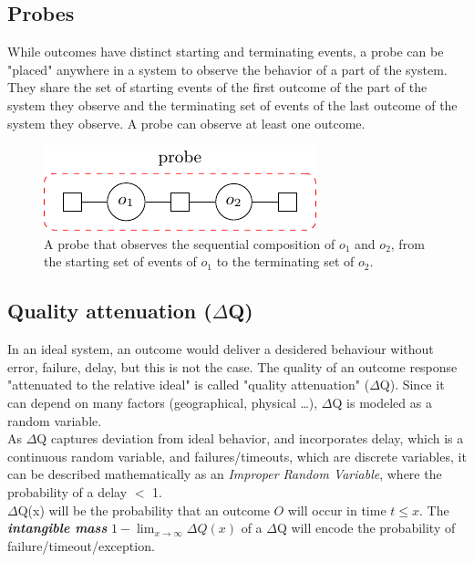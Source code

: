 \subsection{Probes}
    While outcomes have distinct starting and terminating events, a probe can be "placed" anywhere in a system to observe the behavior of a part of the system. They share the set of starting events of the first outcome of the part of the system they observe and the terminating set of events of the last outcome of the system they observe. A probe can observe at least one outcome. 
    
    \begin{figure}[H]
        \begin{center}
            \includegraphics[scale=1.5]{tikz/probe.pdf}
        \end{center}
        \caption{A probe that observes the sequential composition of $o_1$ and $o_2$, from the starting set of events of $o_1$ to the terminating set of $o_2$.}
    \end{figure}

\subsection{Quality attenuation ($\Delta$Q)}
        In an ideal system, an outcome would deliver a desidered behaviour without error, failure, delay, but this is not the case. The quality of an outcome response "attenuated to the relative ideal" is called "quality attenuation" ($\Delta$Q). Since it can depend on many factors (geographical, physical \dots), $\Delta$Q is modeled as a random variable. \\
    As $\Delta$Q captures deviation from ideal behavior, and incorporates delay, which is a continuous random variable, and failures/timeouts, which are discrete variables, it can be described mathematically as an \textit{Improper Random Variable}, where the probability of a delay $<$ 1. \\
    $\Delta$Q(x) will be the probability that an outcome $O$ will occur in time $t \le x$. The \textbf{\textit{intangible mass}} $1 - \lim_{x\to\infty}\Delta Q(x)$ of a $\Delta$Q will encode the probability of failure/timeout/exception.
    
